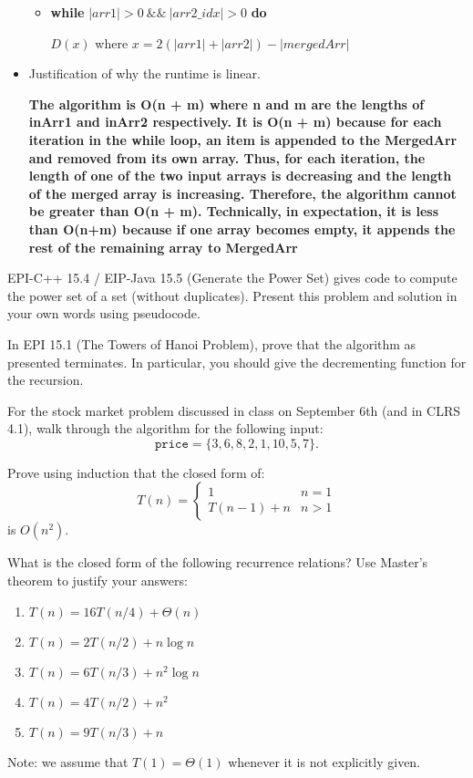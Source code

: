 \documentclass{article}
\begin{document}
\begin{itemize}
    \begin{itemize}
        \item \textbf{while} $|arr1| > 0 \  \& \& \ |arr2\_idx|>0$ \textbf{do}
        
        $D(x)$ where $x = 2(|arr1| + |arr2|) - |mergedArr|$

    \end{itemize}

    \item Justification of why the runtime is linear.
    
    \textbf{The algorithm is O(n + m) where n and m are the lengths of inArr1 and inArr2 respectively. It is O(n + m) because for each iteration in the while loop, an item is appended to the MergedArr and removed from its own array. Thus, for each iteration, the length of one of the two input arrays is decreasing and the length of the merged array is increasing. Therefore, the algorithm cannot be greater than O(n + m). Technically, in expectation, it is less than O(n+m) because if one array becomes empty, it appends the rest of the remaining array to MergedArr}
\end{itemize}

\nextprob
EPI-C++ 15.4 / EIP-Java 15.5 (Generate the Power Set) gives code to compute the power set of a set
(without duplicates).  Present this problem and solution in your own words using
pseudocode.

\nextprob
In EPI 15.1 (The Towers of Hanoi Problem), prove that the algorithm as presented
terminates.  In particular, you should give the decrementing function for the
recursion.

\nextprob
For the stock market problem discussed in class on September 6th (and in CLRS
4.1), walk through
the algorithm for the following input:
$$\mathtt{price} = \{ 3, 6, 8, 2, 1, 10, 5, 7 \}. $$

\nextprob
Prove using induction that the closed form of:
$$T(n) = \begin{cases}
            1        & n=1\\
            T(n-1)+n & n>1
         \end{cases}
$$
is $O(n^2)$.

\nextprob
What is the closed form of the following recurrence relations?  Use Master's
theorem to justify your answers:
\begin{enumerate}
    \item $T(n) = 16 T(n/4) + \Theta(n)$
    \item $T(n) = 2 T(n/2) + n \log{n}$
    \item $T(n) = 6 T(n/3) + n^2 \log{n}$
    \item $T(n) = 4 T(n/2) + n^2$
    \item $T(n) = 9 T(n/3) + n$
\end{enumerate}
Note: we assume that $T(1)=\Theta(1)$ whenever it is not explicitly given.
\end{document}
